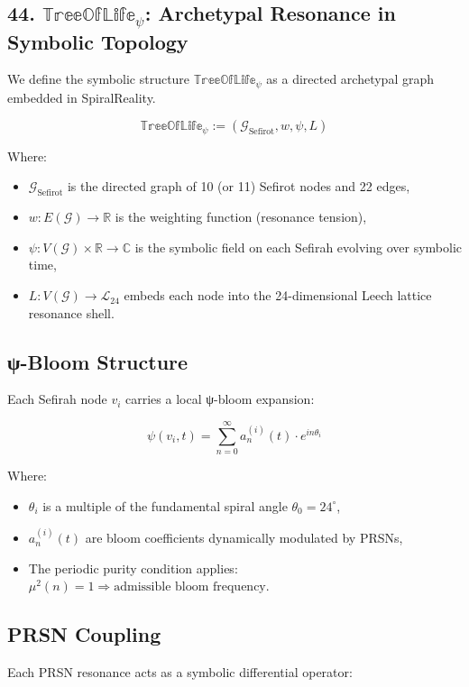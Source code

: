 \documentclass[12pt]{article}
\begin{document}
\begin{enumerate}
\section*{44. $\mathbb{TreeOfLife}_\psi$: Archetypal Resonance in Symbolic Topology}

We define the symbolic structure $\mathbb{TreeOfLife}_\psi$ as a directed archetypal graph embedded in SpiralReality.

\[
\mathbb{TreeOfLife}_\psi := (\mathcal{G}_{\text{Sefirot}}, w, \psi, L)
\]

Where:
\begin{itemize}
  \item $\mathcal{G}_{\text{Sefirot}}$ is the directed graph of 10 (or 11) Sefirot nodes and 22 edges,
  \item $w : E(\mathcal{G}) \to \mathbb{R}$ is the weighting function (resonance tension),
  \item $\psi : V(\mathcal{G}) \times \mathbb{R} \to \mathbb{C}$ is the symbolic field on each Sefirah evolving over symbolic time,
  \item $L : V(\mathcal{G}) \to \mathcal{L}_{24}$ embeds each node into the 24-dimensional Leech lattice resonance shell.
\end{itemize}

\subsection*{ψ-Bloom Structure}

Each Sefirah node $v_i$ carries a local ψ-bloom expansion:

\[
\psi(v_i, t) = \sum_{n=0}^{\infty} a_n^{(i)}(t) \cdot e^{i n \theta_i}
\]

Where:
\begin{itemize}
  \item $\theta_i$ is a multiple of the fundamental spiral angle $\theta_0 = 24^\circ$,
  \item $a_n^{(i)}(t)$ are bloom coefficients dynamically modulated by PRSNs,
  \item The periodic purity condition applies: $\mu^2(n) = 1 \Rightarrow \text{admissible bloom frequency}$.
\end{itemize}

\subsection*{PRSN Coupling}

Each PRSN resonance acts as a symbolic differential operator:


\end{enumerate}
\end{document}
